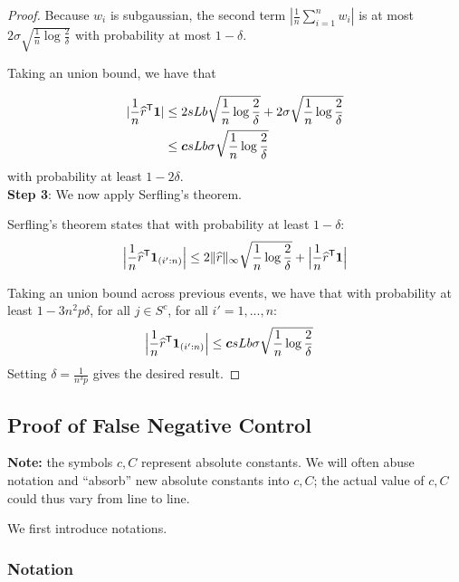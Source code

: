 \begin{proof}
Because $w_i$ is subgaussian, the second term $|\frac{1}{n} \sum_{i=1}^n w_i|$ is at most $2 \sigma \sqrt{ \frac{1}{n} \log \frac{2}{\delta}}$ with probability at most $1-\delta$.

Taking an union bound, we have that 

\begin{align*}
| \frac{1}{n} \widehat{r}^{\mathsf{T}} \mbox{\boldmath $1$}| &\leq 2 sLb \sqrt{\frac{1}{n} \log \frac{2}{\delta}} + 2 \sigma \sqrt{\frac{1}{n} \log \frac{2}{\delta}} \\
  &\leq \mbox{\boldmath $c$} sLb \sigma \sqrt{\frac{1}{n} \log \frac{2}{\delta}} 
\end{align*}
with probability at least $1-2\delta$.\\

\textbf{Step 3}: We now apply Serfling's theorem.

Serfling's theorem states that with probability at least $1 - \delta$:
\[
\Big
|\frac{1}{n} \widehat{r}^{\mathsf{T}} \mbox{\boldmath $1$}_{(i':n)}\Big| \leq
   2\| \widehat{r} \|_\infty \sqrt{ \frac{1}{n} \log \frac{2}{\delta}} + 
   \Big|\frac{1}{n} \widehat{r}^{\mathsf{T}} \mbox{\boldmath $1$} \Big|
\]

Taking an union bound across previous events, we have that with probability at least $1 - 3n^2 p \delta$, for all $j \in S^c$, for all $i'=1,...,n$:
\begin{align*}
\Big|\frac{1}{n} \widehat{r}^{\mathsf{T}} \mbox{\boldmath $1$}_{(i':n)} \Big| &\leq
  \mbox{\boldmath $c$} sLb \sigma \sqrt{\frac{1}{n} \log \frac{2}{\delta}} 
\end{align*}
Setting $\delta = \frac{1}{n^3 p}$ gives the desired result.

\end{proof}

 
 
 
 \subsection{Proof of False Negative Control}
 \label{sec:false_negative_proof}
 
\textbf{Note:} the symbols $c,C$ represent absolute constants. We will often abuse notation and ``absorb'' new absolute constants into $c, C$; the actual value of $c, C$ could thus vary from line to line.

 We first introduce notations.
 \subsubsection{Notation} 
\label{sec:false_negative_proof_notations}

